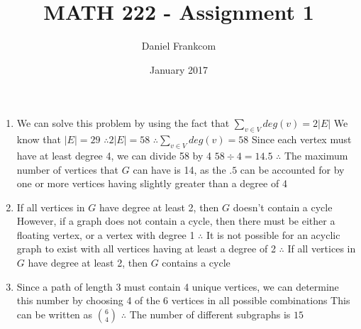 \documentclass{article}
\title{MATH 222 - Assignment 1}
\date{January 2017}
\author{Daniel Frankcom}
\begin{document}
	\maketitle
	\setlength{\parindent}{0pt}
	\newcommand{\forceindent}{\leavevmode{\parindent=72pt\indent}}
	\newpage
	
	\begin{enumerate}
		\item We can solve this problem by using the fact that $\sum\limits_{v\in V}deg(v)=2|E|$
		\newline We know that $|E| = 29$
		\newline $\therefore 2|E|=58$
		\newline $\therefore\sum\limits_{v\in V}deg(v)=58$
		\newline Since each vertex must have at least degree 4, we can divide 58 by 4
		\newline $58\div 4=14.5$
		\newline $\therefore$ The maximum number of vertices that $G$ can have is 14, as the $.5$ can be accounted for by one or more vertices having slightly greater than a degree of 4
		
		\item If all vertices in $G$ have degree at least 2, then $G$ doesn't contain a cycle
		\newline However, if a graph does not contain a cycle, then there must be either a floating vertex, or a vertex with degree 1
		\newline $\therefore$ It is not possible for an acyclic graph to exist with all vertices having at least a degree of 2
		\newline $\therefore$ If all vertices in $G$ have degree at least 2, then $G$ contains a cycle
		
		\item Since a path of length 3 must contain 4 unique vertices, we can determine this number by choosing 4 of the 6 vertices in all possible combinations
		\newline This can be written as $\binom{6}{4}$
		\newline $\therefore$ The number of different subgraphs is $15$
		

\end{enumerate}
\end{document}
